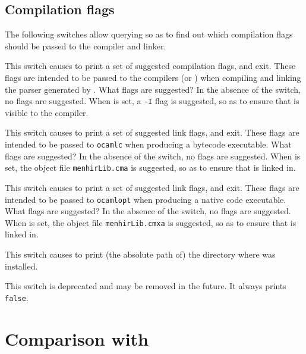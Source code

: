 \documentclass[onecolumn,11pt,nocopyrightspace,preprint]{sigplanconf}
\begin{document}
\subsection{Compilation flags}
\label{sec:build:flags}

The following switches allow querying \menhir so as to find out which
compilation flags should be passed to the \ocaml compiler and linker.

\docswitch{\osuggestcomp} This switch causes \menhir to print a set of
suggested compilation flags, and exit. These flags are intended to be passed
to the \ocaml compilers (\ocamlc or \ocamlopt) when compiling and linking the
parser generated by \menhir. What flags are suggested? In the absence of the
\otable switch, no flags are suggested. When \otable is set, a \texttt{-I}
flag is suggested, so as to ensure that \menhirlib is visible to the \ocaml
compiler.

\docswitch{\osuggestlinkb} This switch causes \menhir to print a set of
suggested link flags, and exit. These flags are intended to be passed to
\texttt{ocamlc} when producing a bytecode executable. What flags are
suggested? In the absence of the \otable switch, no flags are suggested. When
\otable is set, the object file \texttt{menhirLib.cma} is suggested, so as to
ensure that \menhirlib is linked in.

\docswitch{\osuggestlinko} This switch causes \menhir to print a set of
suggested link flags, and exit. These flags are intended to be passed to
\texttt{ocamlopt} when producing a native code executable. What flags are
suggested? In the absence of the \otable switch, no flags are suggested. When
\otable is set, the object file \texttt{menhirLib.cmxa} is suggested, so as to
ensure that \menhirlib is linked in.

\docswitch{\osuggestmenhirlib} This switch causes \menhir to print (the
absolute path of) the directory where \menhirlib was installed.

\docswitch{\osuggestocamlfind} This switch is deprecated and may be removed in
the future. It always prints \texttt{false}.


\section{Comparison with \ocamlyacc}

\end{document}
